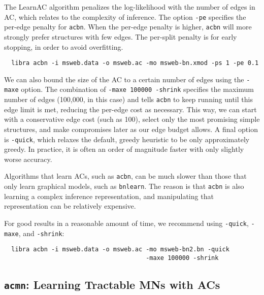 \documentclass[11pt]{article}
\begin{document}
The LearnAC algorithm penalizes the log-likelihood with the number of
edges in AC, which relates to the complexity of inference. The option
{\tt -pe} specifies the per-edge penalty for {\tt acbn}. When the
per-edge penalty is higher, {\tt acbn} will more strongly prefer
structures with few edges.  The per-split penalty is for early
stopping, in order to avoid overfitting.
\begin{verbatim}
  libra acbn -i msweb.data -o msweb.ac -mo msweb-bn.xmod -ps 1 -pe 0.1
\end{verbatim}

We can also bound the size of the AC to a certain number of edges
using the {\tt -maxe} option. The combination of {\tt -maxe 100000
-shrink} specifies the maximum number of edges (100,000, in this case)
and tells {\tt acbn} to keep running until this edge limit is met,
reducing the per-edge cost as necessary.  This way, we can start with
a conservative edge cost (such as 100), select only the most promising
simple structures, and make compromises later as our edge budget
allows.  A final option is {\tt -quick}, which relaxes the default, greedy
heuristic to be only approximately greedy.  In practice, it is often
an order of magnitude faster with only slightly worse accuracy.

Algorithms that learn ACs, such as {\tt acbn}, can be much slower than
those that only learn graphical models, such as {\tt bnlearn}.  The
reason is that {\tt acbn} is also learning a complex inference
representation, and manipulating that representation can be relatively
expensive.

For good results in a reasonable amount of time, we recommend using
{\tt -quick}, {\tt -maxe}, and {\tt -shrink}:
\begin{verbatim}
  libra acbn -i msweb.data -o msweb.ac -mo msweb-bn2.bn -quick
                                       -maxe 100000 -shrink
\end{verbatim}


\subsection{{\tt acmn}: Learning Tractable MNs with ACs} \label{sec:acmn}
\end{document}
